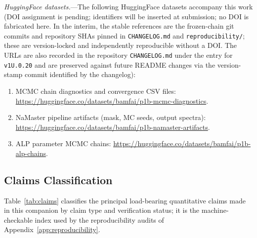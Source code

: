 \documentclass[aps,prd,twocolumn,superscriptaddress,showpacs,preprintnumbers,nofootinbib,longbibliography,floatfix]{revtex4-2}
\newcommand{\paperVersion}{v1U.0.20}
\begin{document}
\textit{HuggingFace datasets.}---The following HuggingFace datasets accompany
this work (DOI assignment is pending; identifiers will be inserted at
submission; no DOI is fabricated here. In the interim, the stable references
are the frozen-chain git commits and repository SHAs pinned in
\texttt{CHANGELOG.md} and \texttt{reproducibility/}; these are
version-locked and independently reproducible without a DOI.
The URLs are also recorded in the repository
\texttt{CHANGELOG.md} under the entry for \texttt{\paperVersion} and are
preserved against future README changes via the version-stamp commit
identified by the changelog):
\begin{enumerate}[leftmargin=*]
\item MCMC chain diagnostics and convergence CSV files:
  \url{https://huggingface.co/datasets/bamfai/p1b-mcmc-diagnostics}.
\item NaMaster pipeline artifacts (mask, MC seeds, output spectra):
  \url{https://huggingface.co/datasets/bamfai/p1b-namaster-artifacts}.
\item ALP parameter MCMC chains:
  \url{https://huggingface.co/datasets/bamfai/p1b-alp-chains}.
\end{enumerate}


\subsection{Claims Classification}\label{app:claims}

Table~\ref{tab:claims} classifies the principal load-bearing quantitative claims made in this
companion by claim type and verification status; it is the
machine-checkable index used by the reproducibility audits of
Appendix~\ref{app:reproducibility}.
\end{document}
